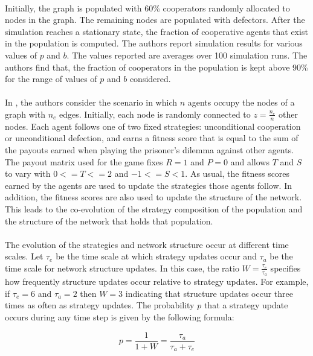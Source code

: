\documentclass{article}
\begin{document}
	\paragraph{}Initially, the graph is populated with 60\% cooperators randomly allocated to nodes in the graph.  The remaining nodes are populated with defectors.  After the simulation reaches a stationary state, the fraction of cooperative agents that exist in the population is computed.  The authors report simulation results for various values of $p$ and $b$.  The values reported are averages over 100 simulation runs.  The authors find that, the fraction of cooperators in the population is kept above 90\% for the range of values of $p$ and $b$ considered.
	\paragraph{}In \cite{Santos2006d}, the authors consider the scenario in which $n$ agents occupy the nodes of a graph with $n_e$ edges.  Initially, each node is randomly connected to $z=\frac{n_e}{n}$ other nodes.  Each agent follows one of two fixed strategies: unconditional cooperation or unconditional defection, and earns a fitness score that is equal to the sum of the payouts earned when playing the prisoner's dilemma against other agents.  The payout matrix used for the game fixes $R=1$ and $P=0$ and allows $T$ and $S$ to vary with $0<=T<=2$ and $-1<=S<1$.  As usual, the fitness scores earned by the agents are used to update the strategies those agents follow.  In addition, the fitness scores are also used to update the structure of the network.  This leads to the co-evolution of the strategy composition of the population and the structure of the network that holds that population.
	\paragraph{}The evolution of the strategies and network structure occur at different time scales.  Let $\tau_e$ be the time scale at which strategy updates occur and $\tau_a$ be the time scale for network structure updates.  In this case, the ratio $W=\frac{\tau_e}{\tau_a}$ specifies how frequently structure updates occur relative to strategy updates.  For example, if $\tau_e=6$ and $\tau_a=2$ then $W=3$ indicating that structure updates occur three times as often as strategy updates.  The probability $p$ that a strategy update occurs during any time step is given by the following formula:
	
	\begin{equation}
	p=\frac{1}{1+W}=\frac{\tau_a}{\tau_a+\tau_e}
	\end{equation}
\end{document}
